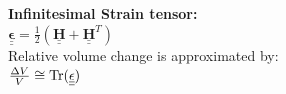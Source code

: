 \textbf{Infinitesimal Strain tensor:} \\
${\underline{\underline{\mathbf{\epsilon}}}} = \frac{1}{2}({\underline{\underline{\mathbf{H}}}}+{\underline{\underline{\mathbf{H}}}}^T)$ \\
Relative volume change is approximated by: \\
$\frac{\Delta V}{V} \cong \operatorname{Tr}({{\underline{\underline{\mathbf{\epsilon}}}}})$

